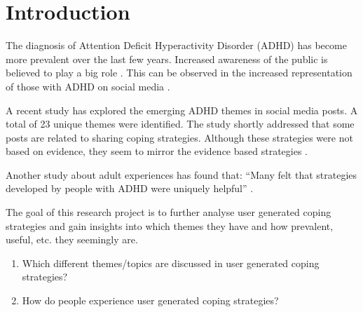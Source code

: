 \section{Introduction}
The diagnosis of Attention Deficit Hyperactivity Disorder (ADHD) has become more prevalent over the last few years. Increased awareness of the public is believed to play a big role \cite{abdelnour2022adhd}. This can be observed in the increased representation of those with ADHD on social media \cite{eagle2023you}.

A recent study has explored the emerging ADHD themes in social media posts. A total of 23 unique themes were identified. The study shortly addressed that some posts are related to sharing coping strategies. Although these strategies were not based on evidence, they seem to mirror the evidence based strategies \cite{scalzo2024using}.

Another study about adult experiences has found that: ``Many felt that strategies developed by people with ADHD were uniquely helpful'' \cite{ginapp2023experiences}.

The goal of this research project is to further analyse user generated coping strategies and gain insights into which themes they have and how prevalent, useful, etc. they seemingly are.

\begin{enumerate}
	\item Which different themes/topics are discussed in user generated coping strategies?
	\item How do people experience user generated coping strategies?
\end{enumerate}
